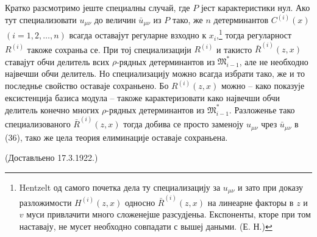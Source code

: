 \documentclass[11pt]{article}
\providecommand{\Mmod}{\mathfrak M}
\begin{document}
Кратко разсмотримо јеште специалны случай, где $P$ јест карактеристики нул. Ако тут специализовати $u_{\mu\nu}$ до величин $\bar u_{\mu\nu}$ из $P$ тако, же $n$ детерминантов $C^{(i)}(x)$ $(i=1,2,\ldots,n)$ всагда оставајут регуларне взходно к $x_i$,\footnote{\mbox{Hentzelt} од самого почетка дела ту специализацију за $u_{\mu\nu}$ и зато при доказу разложимости $H^{(i)}(z,x)$ односно $\bar R^{(i)}(z,x)$ на линеарне факторы в $z$ и $v$ муси привлачити много сложенејше разсудјеньа. Експоненты, кторе при том наставају, не мусет необходно совпадати с вышеј даными. (Е. Н.)} тогда регуларност $R^{(i)}$ такоже сохраньа се. При тој специализацији $R^{(i)}$ и такисто $\bar R^{(i)}(z,x)$ ставајут обчи делитель всих $\rho$-рядных детерминантов из $\Mmod^*_{i-1}$, але не необходно највечши обчи делитель. Но специализацију можно всагда избрати тако, же и то последнье свойство оставаје сохраньено. Бо $R^{(i)}(z,x)$ можно -- како показује ексистенција базиса модула -- такоже карактеризовати како највечши обчи делитель конечно многих $\rho$-рядных детерминантов из $\Mmod^*_{i-1}$. Разложенье тако специализованого $\bar R^{(i)}(z,x)$ тогда добива се просто заменоју $u_{\mu\nu}$ чрез $\bar u_{\mu\nu}$ в (36), тако же цела теория елиминације оставаје сохраньена.

\begin{center}
(Доставльено 17.3.1922.)
\end{center}
\end{document}
